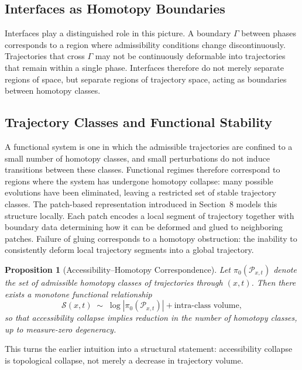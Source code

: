 \documentclass[11pt, a4paper, twocolumn]{article}
\newtheorem{proposition}[definition]{Proposition}
\newcommand{\Sfield}{\mathcal{S}}
\begin{document}
\subsection{Interfaces as Homotopy Boundaries}

Interfaces play a distinguished role in this picture. A boundary $\Gamma$
between phases corresponds to a region where admissibility conditions change
discontinuously. Trajectories that cross $\Gamma$ may not be continuously
deformable into trajectories that remain within a single phase. Interfaces
therefore do not merely separate regions of space, but separate regions of
trajectory space, acting as boundaries between homotopy classes.

\subsection{Trajectory Classes and Functional Stability}

A functional system is one in which the admissible trajectories are confined
to a small number of homotopy classes, and small perturbations do not induce
transitions between these classes. Functional regimes therefore correspond to
regions where the system has undergone homotopy collapse: many possible
evolutions have been eliminated, leaving a restricted set of stable trajectory
classes. The patch-based representation introduced in Section~8 models this
structure locally. Each patch encodes a local segment of trajectory together
with boundary data determining how it can be deformed and glued to neighboring
patches. Failure of gluing corresponds to a homotopy obstruction: the inability
to consistently deform local trajectory segments into a global trajectory.

\begin{proposition}[Accessibility--Homotopy Correspondence]
Let $\pi_0(\mathcal{P}_{x,t})$ denote the set of admissible homotopy classes of
trajectories through $(x,t)$. Then there exists a monotone functional relationship
\[
    \Sfield(x,t)
    \;\sim\;
    \log |\pi_0(\mathcal{P}_{x,t})| + \text{intra-class volume},
\]
so that accessibility collapse implies reduction in the number of homotopy
classes, up to measure-zero degeneracy.
\end{proposition}

This turns the earlier intuition into a structural statement: accessibility
collapse is topological collapse, not merely a decrease in trajectory volume.
\end{document}
